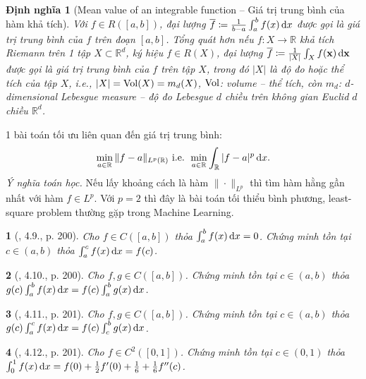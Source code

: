 \documentclass{article}
\newtheorem{baitoan}{}
\newtheorem{dinhnghia}{Định nghĩa}
\begin{document}
\begin{dinhnghia}[Mean value of an integrable function -- Giá trị trung bình của hàm khả tích]
	Với $f\in R([a,b])$, đại lượng $\overline{f}\coloneqq\frac{1}{b - a}\int_a^b f(x)\,{\rm d}x$ được gọi là {\rm giá trị trung bình} của $f$ trên đoạn $[a,b]$. Tổng quát hơn nếu $f:X\to\mathbb{R}$ khả tích Riemann trên 1 tập $X\subset\mathbb{R}^d$, ký hiệu $f\in R(X)$, đại lượng $\overline{f}\coloneqq\frac{1}{|X|}\int_X f({\bf x})\,{\rm d}{\bf x}$ được gọi là {\rm giá trị trung bình} của $f$ trên tập $X$, trong đó $|X|$ là độ đo hoặc thể tích của tập $X$, i.e., $|X| = {\rm Vol}(X) = m_d(X)$, ${\rm Vol}$: volume -- thể tích, còn $m_d$: $d$-dimensional Lebesgue measure -- độ đo Lebesgue $d$ chiều trên không gian Euclid $d$ chiều $\mathbb{R}^d$.
\end{dinhnghia}
1 bài toán tối ưu liên quan đến giá trị trung bình:
\begin{equation*}
	\min_{a\in\mathbb{R}} \|f - a\|_{L^p(\mathbb{R})}\mbox{ i.e. } \min_{a\in\mathbb{R}} \int_\mathbb{R} |f - a|^p\,{\rm d}x.
\end{equation*}
{\it Ý nghĩa toán học.} Nếu lấy khoảng cách là hàm $\|\cdot\|_{L^p}$ thì tìm hàm hằng gần nhất với hàm $f\in L^p$. Với $p = 2$ thì đây là bài toán tối thiểu bình phương, least-square problem thường gặp trong Machine Learning.

\begin{baitoan}[\cite{Quoc_Long_Dat_Nam_VMC}, 4.9., p. 200]
	Cho $f\in C([a,b])$ thỏa $\int_a^b f(x)\,{\rm d}x = 0$. Chứng minh tồn tại $c\in(a,b)$ thỏa $\int_a^c f(x)\,{\rm d}x = f(c)$.
\end{baitoan}

\begin{baitoan}[\cite{Quoc_Long_Dat_Nam_VMC}, 4.10., p. 200]
	Cho $f,g\in C([a,b])$. Chứng minh tồn tại $c\in(a,b)$ thỏa $g(c)\int_a^b f(x)\,{\rm d}x = f(c)\int_a^b g(x)\,{\rm d}x$.
\end{baitoan}

\begin{baitoan}[\cite{Quoc_Long_Dat_Nam_VMC}, 4.11., p. 201]
	Cho $f,g\in C([a,b])$. Chứng minh tồn tại $c\in(a,b)$ thỏa $g(c)\int_a^c f(x)\,{\rm d}x = f(c)\int_c^b g(x)\,{\rm d}x$.
\end{baitoan}

\begin{baitoan}[\cite{Quoc_Long_Dat_Nam_VMC}, 4.12., p. 201]
	Cho $f\in C^2([0,1])$. Chứng minh tồn tại $c\in(0,1)$ thỏa $\int_0^1 f(x)\,{\rm d}x = f(0) + \frac{1}{2}f'(0) + \frac{1}{6} + \frac{1}{6}f''(c)$.
\end{baitoan}
\end{document}
